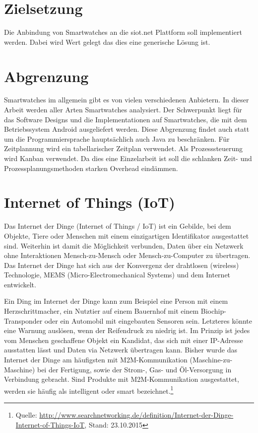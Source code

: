 \section{Zielsetzung}
Die Anbindung von Smartwatches an die siot.net Plattform soll implementiert werden. Dabei wird Wert gelegt das dies eine generische Lösung ist.

\section{Abgrenzung}
Smartwatches im allgemein gibt es von vielen verschiedenen Anbietern. In dieser Arbeit werden aller Arten Smartwatches analysiert. Der Schwerpunkt liegt für das Software Designs und die Implementationen auf Smartwatches, die mit dem Betriebssystem Android ausgeliefert werden. Diese Abgrenzung findet auch statt um die Programmiersprache hauptsächlich auch Java zu beschränken.
Für Zeitplannung wird ein tabellarischer Zeitplan verwendet. Als Prozesssteuerung wird Kanban verwendet. Da dies eine Einzelarbeit ist soll die schlanken Zeit- und Prozessplanungsmethoden starken Overhead eindämmen.

\section{Internet of Things (IoT)}
Das Internet der Dinge (Internet of Things / IoT) ist ein Gebilde, bei dem Objekte, Tiere oder Menschen mit einem einzigartigen Identifikator ausgestattet sind. Weiterhin ist damit die Möglichkeit verbunden, Daten über ein Netzwerk ohne Interaktionen Mensch-zu-Mensch oder Mensch-zu-Computer zu übertragen. Das Internet der Dinge hat sich aus der Konvergenz der drahtlosen (wireless) Technologie, MEMS (Micro-Electromechanical Systems) und dem Internet entwickelt.

Ein Ding im Internet der Dinge kann zum Beispiel eine Person mit einem Herzschrittmacher, ein Nutztier auf einem Bauernhof mit einem Biochip-Transponder oder ein Automobil mit eingebauten Sensoren sein. Letzteres könnte eine Warnung auslösen, wenn der Reifendruck zu niedrig ist. Im Prinzip ist jedes vom Menschen geschaffene Objekt ein Kandidat, das sich mit einer IP-Adresse ausstatten lässt und Daten via Netzwerk übertragen kann. Bisher wurde das Internet der Dinge am häufigsten mit M2M-Kommunikation (Maschine-zu-Maschine) bei der Fertigung, sowie der Strom-, Gas- und Öl-Versorgung in Verbindung gebracht. Sind Produkte mit M2M-Kommunikation ausgestattet, werden sie häufig als intelligent oder smart bezeichnet.\footnote{Quelle: \url{http://www.searchnetworking.de/definition/Internet-der-Dinge-Internet-of-Things-IoT}, Stand: 23.10.2015}


